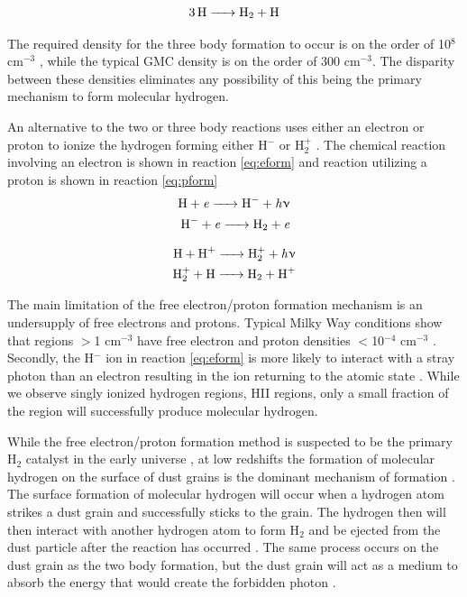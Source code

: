 \begin{equation}\label{eq:3bod}
  \ce{3H -> H_2 + H}
\end{equation}

The required density for the three body formation to occur is on the order of 10$^8$ cm$^{-3}$ \citep{palla1983,abel1997}, while the typical GMC density is on the order of 300 cm$^{-3}$.  The disparity between these densities eliminates any possibility of this being the primary mechanism to form molecular hydrogen. 

An alternative to the two or three body reactions uses either an electron or proton to ionize the hydrogen forming either H$^-$ or H$_2^+$ \citep{krumholz2014}.  The chemical reaction involving an electron is shown in reaction \ref{eq:eform} and reaction utilizing a proton is shown in reaction \ref{eq:pform}
\begin{equation}\label{eq:eform}
  \begin{split}
    \ce{H + \it{e} -> H^- + \it{h\nu}} \\
    \ce{H^- + \it{e} -> H_2 + \it{e}}
  \end{split}
\end{equation}

\begin{equation}\label{eq:pform}
  \begin{split}
    \ce{H + H^+ -> H^+_2 + \it{h\nu}} \\
    \ce{H^+_2 + H -> H_2 + H^+}
  \end{split}
\end{equation}

The main limitation of the free electron/proton formation mechanism is an undersupply of free electrons and protons.  Typical Milky Way conditions show that regions $>$1 cm$^{-3}$ have free electron and proton densities $<$10$^{-4}$ cm$^{-3}$ \citep{wolfire2003}.  Secondly, the H$^-$ ion in reaction \ref{eq:eform} is more likely to interact with a stray photon than an electron resulting in the ion returning to the atomic state \citep{glover2003}.  While we observe singly ionized hydrogen regions, HII regions, only a small fraction of the region will successfully produce molecular hydrogen.

While the free electron/proton formation method is suspected to be the primary H$_2$ catalyst in the early universe \citep{herbst2005}, at low redshifts the formation of molecular hydrogen on the surface of dust grains is the dominant mechanism of formation \citep{krumholz2014}.  The surface formation of molecular hydrogen will occur when a hydrogen atom strikes a dust grain and successfully sticks to the grain.  The hydrogen then will then interact with another hydrogen atom to form H$_2$ and be ejected from the dust particle after the reaction has occurred \citep{pirronello1997}.  The same process occurs on the dust grain as the two body formation, but  the dust grain will act as a medium to absorb the energy that would create the forbidden photon \citep{krumholz2014}.


